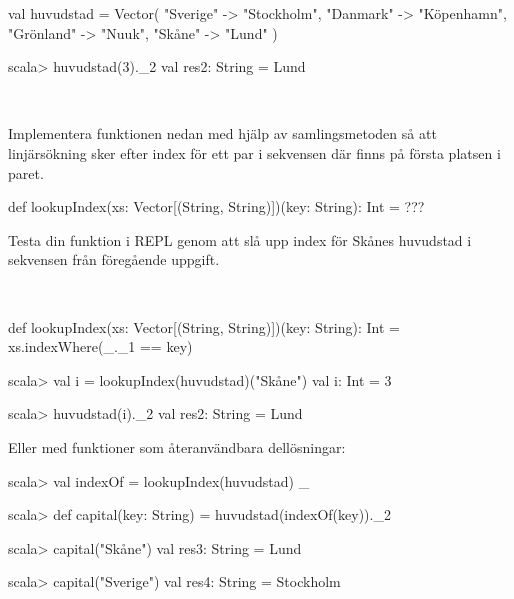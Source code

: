 \SubtaskSolved

\begin{Code}
val huvudstad = Vector(
  "Sverige"  -> "Stockholm",
  "Danmark"  -> "Köpenhamn",
  "Grönland" -> "Nuuk",
  "Skåne"    -> "Lund"
)
\end{Code}

\SubtaskSolved
\begin{REPL}
scala> huvudstad(3)._2
val res2: String = Lund
\end{REPL}

\QUESTEND




\QUESTBEGIN

\Task \what~

\Subtask Implementera funktionen  nedan med hjälp av samlingsmetoden  så att linjärsökning sker efter index för ett par i sekvensen där  finns på första platsen i paret.

\begin{Code}
def lookupIndex(xs: Vector[(String, String)])(key: String): Int = ???
\end{Code}

\Subtask Testa din funktion i REPL genom att slå upp index för Skånes huvudstad i sekvensen  från föregående uppgift.

\SOLUTION

\TaskSolved \what~

\SubtaskSolved
\begin{Code}
def lookupIndex(xs: Vector[(String, String)])(key: String): Int =
  xs.indexWhere(_._1 == key)
\end{Code}

\SubtaskSolved
\begin{REPL}
scala> val i = lookupIndex(huvudstad)("Skåne")
val i: Int = 3

scala> huvudstad(i)._2
val res2: String = Lund
\end{REPL}

\noindent Eller med funktioner som återanvändbara dellösningar:
\begin{REPL}
scala> val indexOf = lookupIndex(huvudstad) _

scala> def capital(key: String) = huvudstad(indexOf(key))._2

scala> capital("Skåne")
val res3: String = Lund

scala> capital("Sverige")
val res4: String = Stockholm
\end{REPL}

